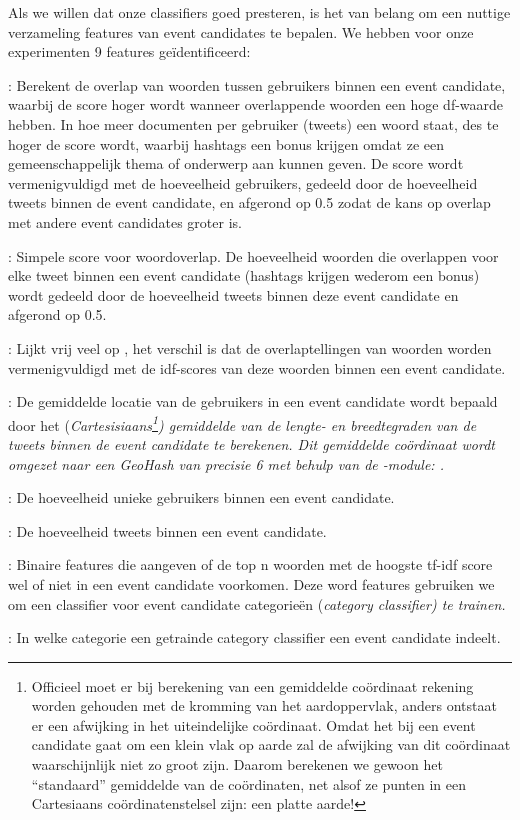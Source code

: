 {{\label{FeatureSelector}

Als we willen dat onze classifiers goed presteren, is het van belang om een 
nuttige verzameling features van event candidates te bepalen. We hebben voor 
onze experimenten 9 features ge\"identificeerd:

\begin{bullets}
\item {}: Berekent de overlap van woorden tussen gebruikers binnen een 
event candidate, waarbij de score hoger wordt wanneer overlappende woorden een 
hoge df-waarde hebben. In hoe meer documenten per gebruiker (tweets) een woord staat, des 
te hoger de score wordt, waarbij hashtags een bonus krijgen omdat ze een 
gemeenschappelijk thema of onderwerp aan kunnen geven. De score wordt 
vermenigvuldigd met de hoeveelheid gebruikers, gedeeld door de hoeveelheid 
tweets binnen de event candidate, en afgerond op 0.5 zodat de kans op overlap 
met andere event candidates groter is.
\item {}: Simpele score voor woordoverlap. De hoeveelheid woorden die 
overlappen voor elke tweet binnen een event candidate (hashtags krijgen wederom 
een bonus) wordt gedeeld door de hoeveelheid tweets binnen deze event candidate 
en afgerond op 0.5.
\item {}: Lijkt vrij veel op , het verschil is dat de 
overlaptellingen van woorden worden vermenigvuldigd met de idf-scores van deze 
woorden binnen een event candidate.
\item {}: De gemiddelde locatie van de gebruikers in een event candidate wordt 
bepaald door het (\it{Cartesisiaans}\footnote{Officieel moet er bij berekening van 
een gemiddelde coördinaat rekening worden gehouden met de
kromming van het aardoppervlak, anders ontstaat er een afwijking in het 
uiteindelijke coördinaat. Omdat het bij een event candidate gaat om een klein 
vlak op aarde zal de afwijking van dit coördinaat waarschijnlijk niet zo groot 
zijn. Daarom berekenen we gewoon het “standaard” gemiddelde van de coördinaten, net 
alsof ze punten in een Cartesiaans coördinatenstelsel zijn: een platte aarde!}) 
gemiddelde van de lengte- en breedtegraden van de tweets binnen de event 
candidate te berekenen. Dit gemiddelde coördinaat wordt omgezet naar een GeoHash van 
precisie 6 met behulp van de -module: .
\item {}: De hoeveelheid unieke gebruikers binnen een event candidate.
\item {}: De hoeveelheid tweets binnen een event candidate.
\item {}: Binaire features die aangeven of de top n woorden met de hoogste 
tf-idf score wel of niet in een event candidate voorkomen. Deze word features 
gebruiken we om een classifier voor event candidate categorieën (\it{category 
classifier}) te trainen.
\item {}: In welke categorie een getrainde category classifier een event 
candidate indeelt.
\end{bullets}

}}
